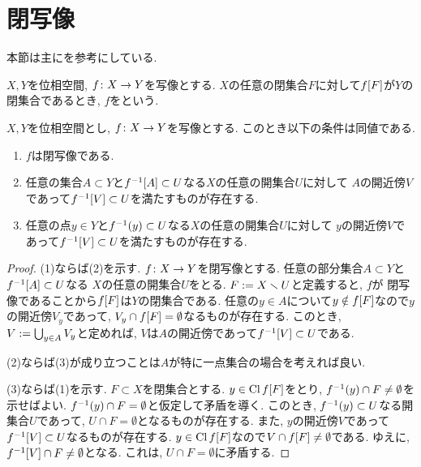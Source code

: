 \documentclass[uplatex, dvipdfmx, a4paper, 12pt, class=jsbook, crop=false]{standalone}
\begin{document}
\section{閉写像}
\label{sec:closed-maps}

\newcommand{\identity}{\mathrm{id}}

\begin{source}
	本節は主に\cite{Engelking1989GT}を参考にしている.
\end{source}

\begin{definition}
	$ X, Y $を位相空間, $ f\colon X\to Y $を写像とする.
	$ X $の任意の閉集合$ F $に対して$ \mapset{f}{F} $が$ Y $の閉集合であるとき,
	$ f $をという.
\end{definition}

\begin{proposition}
	\label{c00001}
	$ X, Y $を位相空間とし, $ f\colon X\to Y $を写像とする.
	このとき以下の条件は同値である.
	\begin{enumerate}
		\item $ f $は閉写像である.
		\item 任意の集合$ A \subset Y $と$ \mapinvset{f}{A} \subset U $なる$ X $の任意の開集合$ U $に対して
		$ A $の開近傍$ V $であって$ \mapinvset{f}{V} \subset U $を満たすものが存在する.
		\item 任意の点$ y \in Y $と$ \mapinvpt{f}{y} \subset U $なる$ X $の任意の開集合$ U $に対して
		$ y $の開近傍$ V $であって$ \mapinvset{f}{V} \subset U $を満たすものが存在する.
	\end{enumerate}
\end{proposition}

\begin{proof}
	(1)ならば(2)を示す. $ f\colon X\to Y $を閉写像とする.
	任意の部分集合$ A \subset Y $と$ \mapinvset{f}{A} \subset U $なる
	$ X $の任意の開集合$ U $をとる. $ F \mathrel{:=} X \smallsetminus U $と定義すると, $ f $が
	閉写像であることから$ \mapset{f}{F} $は$ Y $の閉集合である.
	任意の$ y \in A $について$ y \notin \mapset{f}{F} $なので$ y $の開近傍$ V_y $であって,
	$ V_y \cap \mapset{f}{F} = \emptyset $なるものが存在する.
	このとき, $ V \mathrel{:=} \bigcup_{y \in A} V_y $と定めれば,
	$ V $は$ A $の開近傍であって$ \mapinvset{f}{V} \subset U $である.

	(2)ならば(3)が成り立つことは$ A $が特に一点集合の場合を考えれば良い.

	(3)ならば(1)を示す. $ F \subset  X $を閉集合とする.
	$ y \in \topcl \mapset{f}{F} $をとり, $ \mapinvpt{f}{y} \cap F \neq \emptyset $を示せばよい.
	$ \mapinvpt{f}{y} \cap F = \emptyset $と仮定して矛盾を導く.
	このとき, $ \mapinvpt{f}{y} \subset U $なる開集合$ U $であって, $ U \cap F = \emptyset $となるものが存在する.
	また, $ y $の開近傍$ V $であって$ \mapinvset{f}{V} \subset U $なるものが存在する.
	$ y \in \topcl \mapset{f}{F} $なので$ V \cap \mapset{f}{F} \neq \emptyset $である.
	ゆえに, $ \mapinvset{f}{V} \cap F \neq \emptyset $となる.
	これは, $ U \cap F = \emptyset $に矛盾する.
\end{proof}
\end{document}
